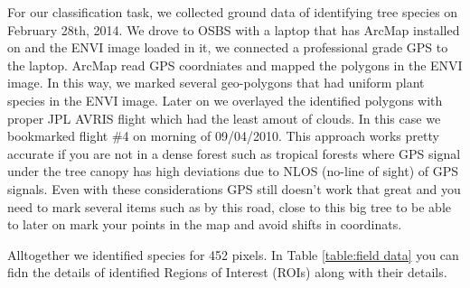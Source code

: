 \documentclass[remotesensing,article,accept,moreauthors,pdftex,12pt,a4paper]{mdpi}
\begin{document}
For our classification task, we collected ground data of identifying tree species on February 28th, 2014. We drove to OSBS with a laptop that has ArcMap installed on and the ENVI image loaded in it, we connected a professional grade GPS to the laptop. ArcMap read GPS coordniates and mapped the polygons in the ENVI image. In this way, we marked several geo-polygons that had uniform plant species in the ENVI image. Later on we overlayed the identified polygons with proper JPL AVRIS flight which had the least amout of clouds. In this case we bookmarked flight \#4 on morning of 09/04/2010. This approach works pretty accurate if you are not in a dense forest such as tropical forests where GPS signal under the tree canopy has high deviations due to NLOS (no-line of sight) of GPS signals. Even with these considerations GPS still doesn't work that great and you need to mark several items such as by this road, close to this big tree to be able to later on mark your points in the map and avoid shifts in coordinats.

Alltogether we identified species for 452 pixels. In Table \ref{table:field data} you can fidn the details of identified Regions of Interest (ROIs) along with their details. 
\end{document}
